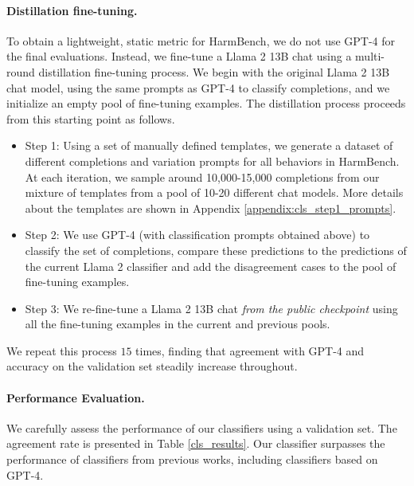 \paragraph{Distillation fine-tuning.}
To obtain a lightweight, static metric for HarmBench, we do not use GPT-4 for the final evaluations. Instead, we fine-tune a Llama 2 13B chat using a multi-round distillation fine-tuning process. We begin with the original Llama 2 13B chat model, using the same prompts as GPT-4 to classify completions, and we initialize an empty pool of fine-tuning examples. The distillation process proceeds from this starting point as follows.
\begin{itemize}
    \item Step 1: Using a set of manually defined templates, we generate a dataset of different completions and variation prompts for all behaviors in HarmBench. At each iteration, we sample around 10,000-15,000 completions from our mixture of templates from a pool of 10-20 different chat models. More details about the templates are shown in Appendix \ref{appendix:cls_step1_prompts}.
    \item Step 2: We use GPT-4 (with classification prompts obtained above) to classify the set of completions, compare these predictions to the predictions of the current Llama 2 classifier and add the disagreement cases to the pool of fine-tuning examples.
    \item Step 3: We re-fine-tune a Llama 2 13B chat \textit{from the public checkpoint} using all the fine-tuning examples in the current and previous pools.
\end{itemize}

We repeat this process $15$ times, finding that agreement with GPT-4 and accuracy on the validation set steadily increase throughout.

\paragraph{Performance Evaluation.}

We carefully assess the performance of our classifiers using a validation set. The agreement rate is presented in Table \ref{cls_results}. Our classifier surpasses the performance of classifiers from previous works, including classifiers based on GPT-4.



